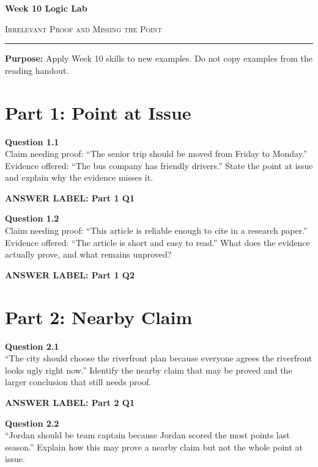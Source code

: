 \documentclass[12pt]{article}
\newcommand{\answerbox}[2]{%
\vspace{0.15em}
\noindent\textbf{#1}\par
\vspace{0.05em}
\noindent\fbox{%
\begin{minipage}[t][#2]{\dimexpr\textwidth-2\fboxsep-2\fboxrule}
\rule{\textwidth}{0pt}
\vspace{#2}
\end{minipage}
}\par
\vspace{0.25em}
}
\begin{document}
\begin{center}
{\LARGE\bfseries Week 10 Logic Lab}\par\vspace{0.05em}
{\large\scshape Irrelevant Proof and Missing the Point}\par\vspace{0.1em}
\rule{0.78\textwidth}{0.5pt}\par\vspace{0.15em}
\end{center}

\noindent\textbf{Purpose:} Apply Week 10 skills to new examples. Do not copy examples from the reading handout.

\vspace{0.3em}

\section*{Part 1: Point at Issue}

\textbf{Question 1.1}\\[-0.15em]
Claim needing proof: ``The senior trip should be moved from Friday to Monday.'' Evidence offered: ``The bus company has friendly drivers.'' State the point at issue and explain why the evidence misses it.

\answerbox{ANSWER LABEL: Part 1 Q1}{2.3in}

\textbf{Question 1.2}\\[-0.15em]
Claim needing proof: ``This article is reliable enough to cite in a research paper.'' Evidence offered: ``The article is short and easy to read.'' What does the evidence actually prove, and what remains unproved?

\answerbox{ANSWER LABEL: Part 1 Q2}{2.3in}

\newpage

\section*{Part 2: Nearby Claim}

\textbf{Question 2.1}\\[-0.15em]
``The city should choose the riverfront plan because everyone agrees the riverfront looks ugly right now.'' Identify the nearby claim that may be proved and the larger conclusion that still needs proof.

\answerbox{ANSWER LABEL: Part 2 Q1}{2.55in}

\textbf{Question 2.2}\\[-0.15em]
``Jordan should be team captain because Jordan scored the most points last season.'' Explain how this may prove a nearby claim but not the whole point at issue.
\end{document}
